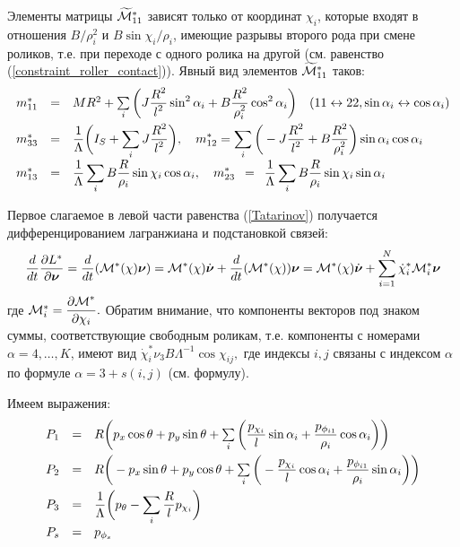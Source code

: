 Элементы матрицы $\widetilde{\mathcal{M}}^*_{11}$ зависят только от координат $\chi_i$, которые входят в отношения $B/\rho_i^2$ и $B\sin\chi_i/\rho_i$, имеющие разрывы второго рода при смене роликов, т.е. при переходе с одного ролика на другой (см. равенство (\ref{constraint_roller_contact})). Явный вид элементов $\widetilde{\mathcal{M}}^*_{11}$ таков:
\begin{equation}\label{mstar}
    \begin{array}{rcl}
        m^*_{11} & = & MR^2 + \sum\limits_i \bigg( J\ddfrac{R^2}{l^2}\sin^2\alpha_i + B\ddfrac{R^2}{\rho_i^2}\cos^2\alpha_i\bigg)\quad(11 \leftrightarrow 22, \sin\alpha_i \leftrightarrow \cos\alpha_i)\vsp
        m^*_{33} & = & \ddfrac{1}{\Lambda}\bigg(I_S + \sum\limits_i J\ddfrac{R^2}{l^2}\bigg),\quad
        m^*_{12}  =  \sum\limits_i \bigg(-J\ddfrac{R^2}{l^2} + B\ddfrac{R^2}{\rho_i^2}\bigg)\sin\alpha_i\cos\alpha_i\vsp
        m^*_{13} & = & \ddfrac{1}{\Lambda}\sum\limits_i B\ddfrac{R}{\rho_i}\sin\chi_i\cos\alpha_i,
        \quad
        m^*_{23} \enspace = \enspace \ddfrac{1}{\Lambda}\sum\limits_i B\ddfrac{R}{\rho_i}\sin\chi_i\sin\alpha_i
    \end{array}
\end{equation}

Первое слагаемое в левой части равенства (\ref{Tatarinov}) получается дифференцированием лагранжиана и подстановкой связей:
\begin{equation}\label{DLStarDnuDdt}
    \frac{d}{dt}\frac{\partial L^{*}}{\partial \boldsymbol{\mathbf{\nu}}} = \frac{d}{dt}(\mathcal{M}^*(\chi)\boldsymbol{\mathbf{\nu}}) = 
    \mathcal{M}^*(\chi)\dot{\boldsymbol{\mathbf{\nu}}} +
    \frac{d}{dt}(\mathcal{M}^*(\chi))\boldsymbol{\mathbf{\nu}} =
    \mathcal{M}^*(\chi)\dot{\boldsymbol{\mathbf{\nu}}} +
    \sum_{i=1}^{N}\dot{\chi}_i^*\mathcal{M}^*_i\boldsymbol{\mathbf{\nu}}
\end{equation}
где $\mathcal{M}^*_i = \displaystyle\frac{\displaystyle \partial \mathcal{M}^*}{\displaystyle \partial \chi_i}.$ Обратим внимание, что компоненты векторов под знаком суммы, соответствующие свободным роликам, т.е. компоненты с номерами $\alpha = 4,\dots, K$, имеют вид $\dot{\chi}_i^*\nu_3B\Lambda^{-1}\cos\chi_{ij},$
где индексы $i,j$ связаны с индексом $\alpha$ по формуле $\alpha = 3 + s(i, j)$ (см. формулу).

Имеем выражения:
\begin{equation}\label{P}
    \begin{array}{rcl}
        P_1 & = & R\bigg(p_x\cos\theta + p_y\sin\theta + \sum\limits_{i}\bigg(\ddfrac{p_{\chi_i}}{l}\sin\alpha_i +  \ddfrac{p_{\phi_{i1}}}{\rho_i}\cos\alpha_i\bigg)\bigg)\vsp
        P_2 & = & R\bigg(-p_x\sin\theta + p_y\cos\theta + \sum\limits_{i}\bigg(-\ddfrac{p_{\chi_i}}{l}\cos\alpha_i +  \ddfrac{p_{\phi_{i1}}}{\rho_i}\sin\alpha_i\bigg)\bigg)\vsp
        P_3 & = & \ddfrac{1}{\Lambda}\bigg(p_\theta - \sum\limits_{i}\ddfrac{R}{l}p_{\chi_i}\bigg)\vsp
        P_s & = & p_{\phi_s}
    \end{array}
\end{equation}

